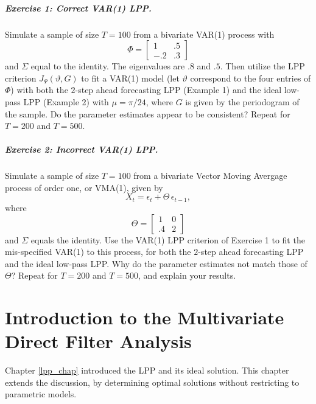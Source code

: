 \documentclass[a4paper]{book}
\begin{document}
\vspace{.5cm}

\paragraph{Exercise 1: Correct VAR(1) LPP.}  Simulate a sample of size $T=100$ from a
  bivariate VAR(1) process with 
\[
  \Phi = \left[ \begin{array}{ll} 1 & .5 \\ -.2 & .3 \end{array} \right]
\]
 and $\Sigma$ equal to the identity.  The eigenvalues are $.8$ and $.5$.
 Then utilize the LPP criterion $J_{\Psi} (\vartheta, G)$ to fit a VAR(1) model (let
 $\vartheta$ correspond to the four entries of $\Phi$) with both the $2$-step
 ahead forecasting LPP (Example 1) and the ideal low-pass LPP (Example 2) with 
  $\mu = \pi/24$, where $G$ is given by the periodogram of the sample.
  Do the parameter estimates appear to be consistent?  Repeat for $T=200$ and $T=500$.

\paragraph{Exercise 2: Incorrect VAR(1) LPP.}  Simulate a sample of size $T=100$ from
 a bivariate Vector Moving Avergage process of order one, or VMA(1), given by
\[
  X_t = \epsilon_t + \Theta \, \epsilon_{t-1},
\]
  where
\[
 \Theta = \left[ \begin{array}{ll} 1 & 0 \\ .4 & 2 \end{array} \right]
\]
  and $\Sigma$ equals the identity.  Use the VAR(1) LPP criterion of Exercise 1 to 
 fit the mis-specified VAR(1) to this process, for both the $2$-step ahead forecasting
 LPP and the ideal low-pass LPP.  Why do the parameter estimates not match those
 of $\Theta$?  Repeat for $T=200$ and $T=500$, and explain your results.








\chapter{Introduction to the Multivariate Direct Filter Analysis}

Chapter \ref{lpp_chap} introduced the LPP and its ideal solution.  This chapter
 extends the discussion, by determining optimal solutions without restricting
 to parametric models.
\end{document}
